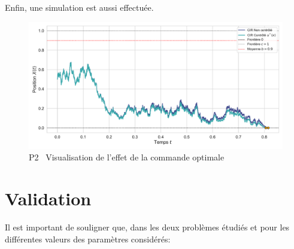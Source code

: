 \FloatBarrier Enfin, une simulation est aussi effectuée. 
\begin{figure}[htb]
    \centering
    \includegraphics[width=0.9\linewidth]{img/validation/P3/p3_control_simulation.pdf}
    \caption{P2 \textemdash~Visualisation de l'effet de la commande optimale}\label{fig:Simulation3}
\end{figure}\FloatBarrier\section{Validation}
Il est important de souligner que, dans les deux problèmes étudiés et pour les différentes valeurs des paramètres considérés:
